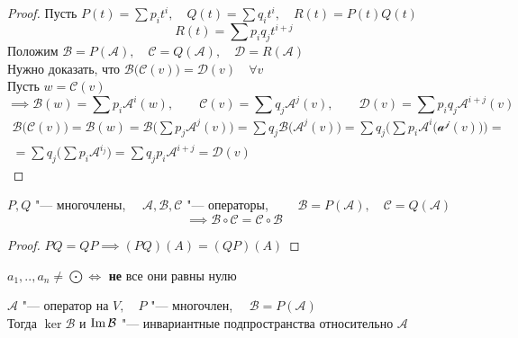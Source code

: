 \begin{proof}
	Пусть $ P(t) = \sum p_it^i, \quad Q(t) = \sum q_it^i, \quad R(t) = P(t)Q(t) $
	$$ R(t) = \sum p_iq_jt^{i + j} $$
	Положим $ \mathcal{B} = P(\mathcal{A}), \quad \mathcal{C} = Q(\mathcal{A}), \quad \mathcal{D} = R(\mathcal{A}) $ \\
	Нужно доказать, что $ \mathcal{B} \bigg( \mathcal{C}(v) \bigg) = \mathcal{D}(v) \quad \forall v $ \\
	Пусть $ w = \mathcal{C}(v) $
	$$ \implies \mathcal{B}(w) = \sum p_i \mathcal{A}^i(w), \qquad \mathcal{C}(v) = \sum q_j\mathcal{A}^j(v), \qquad \mathcal{D}(v) = \sum p_iq_j \mathcal{A}^{i + j}(v) $$
	\begin{multline*}
		\mathcal{B} \bigg( \mathcal{C}(v) \bigg) = \mathcal{B}(w) = \mathcal{B} \bigg( \sum p_j \mathcal{A}^j(v) \bigg) = \sum q_j \mathcal{B} \bigg( \mathcal{A}^j(v) \bigg) = \sum q_j \bigg( \sum p_i \mathcal{A}^i \big( \mathcal{a^j}(v) \big) \bigg) = \\
		= \sum q_j \bigg( \sum p_i \mathcal{A}^{i _ j} \bigg) = \sum q_jp_i \mathcal{A}^{i + j} = \mathcal{D}(v)
	\end{multline*}
\end{proof}

\begin{implication}
	$ P, Q $ "--- многочлены, $ \quad \mathcal{A}, \mathcal{B}, \mathcal{C} $ "--- операторы, $ \qquad \mathcal{B} = P(\mathcal{A}), \quad \mathcal{C} = Q(\mathcal{A}) $
	$$ \implies \mathcal{B} \circ \mathcal{C} = \mathcal{C} \circ \mathcal{B} $$
\end{implication}

\begin{proof}
	$ PQ = QP \implies (PQ)(A) = (QP)(A) $
\end{proof}

\begin{notation}
	$ a_1, .., a_n \ne \bigodot \iff $ \textbf{не} все они равны нулю
\end{notation}

\begin{theorem}
	$ \mathcal{A} $ "--- оператор на $ V, \quad P $ "--- многочлен, $ \quad \mathcal{B} = P(\mathcal{A}) $ \\
	Тогда $ \ker \mathcal{B} $ и $ \operatorname{Im} \mathcal{B} $ "--- инвариантные подпространства относительно $ \mathcal{A} $
\end{theorem}

